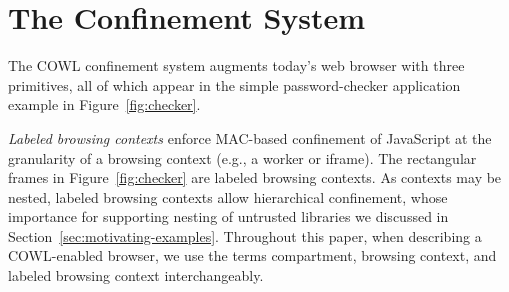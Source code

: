 \section{The \sys{} Confinement System}
\label{sec:system}

The COWL confinement system augments today's web browser with three
primitives, all of which appear in the simple password-checker
application example in Figure~\ref{fig:checker}.
%


%

{\em Labeled browsing contexts} enforce MAC-based confinement of
  JavaScript at the granularity of a browsing context (e.g., a worker
  or iframe). The rectangular frames in Figure~\ref{fig:checker} are
  labeled browsing contexts. As contexts may be nested, labeled
  browsing contexts allow hierarchical confinement, whose importance
  for supporting nesting of untrusted libraries we discussed in
  Section~\ref{sec:motivating-examples}. Throughout this paper, when describing a
  COWL-enabled browser, we use the terms compartment, browsing
  context, and labeled browsing context interchangeably.

